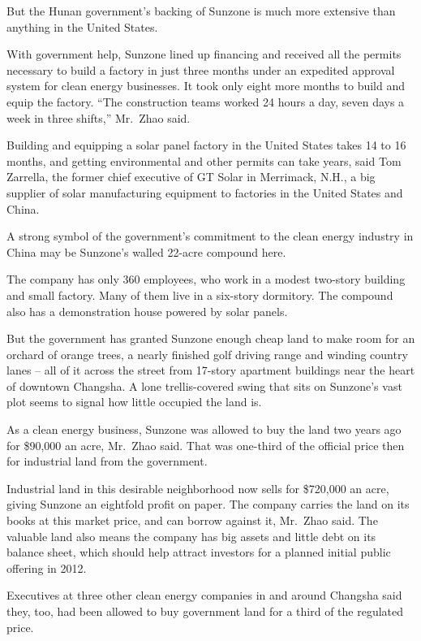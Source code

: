 ﻿\documentclass[12pt]{article}
\begin{document}
But the Hunan government's backing of Sunzone is much more extensive than anything in the United
States.

With government help, Sunzone lined up financing and received all the permits necessary to build a
factory in just three months under an expedited approval system for clean energy businesses. It took
only eight more months to build and equip the factory. ``The construction teams worked 24 hours a
day, seven days a week in three shifts,'' Mr.~Zhao said.

Building and equipping a solar panel factory in the United States takes 14 to 16 months, and getting
environmental and other permits can take years, said Tom Zarrella, the former chief executive of GT
Solar in Merrimack, N.H., a big supplier of solar manufacturing equipment to factories in the United
States and China.

A strong symbol of the government's commitment to the clean energy industry in China may be
Sunzone's walled 22-acre compound here.

The company has only 360 employees, who work in a modest two-story building and small factory. Many
of them live in a six-story dormitory. The compound also has a demonstration house powered by solar
panels.

But the government has granted Sunzone enough cheap land to make room for an orchard of orange
trees, a nearly finished golf driving range and winding country lanes -- all of it across the street
from 17-story apartment buildings near the heart of downtown Changsha. A lone trellis-covered swing
that sits on Sunzone's vast plot seems to signal how little occupied the land is.

As a clean energy business, Sunzone was allowed to buy the land two years ago for \$90,000 an acre,
Mr.~Zhao said. That was one-third of the official price then for industrial land from the
government.

Industrial land in this desirable neighborhood now sells for \$720,000 an acre, giving Sunzone an
eightfold profit on paper. The company carries the land on its books at this market price, and can
borrow against it, Mr.~Zhao said. The valuable land also means the company has big assets and little
debt on its balance sheet, which should help attract investors for a planned initial public offering
in 2012.

Executives at three other clean energy companies in and around Changsha said they, too, had been
allowed to buy government land for a third of the regulated price.
\end{document}
